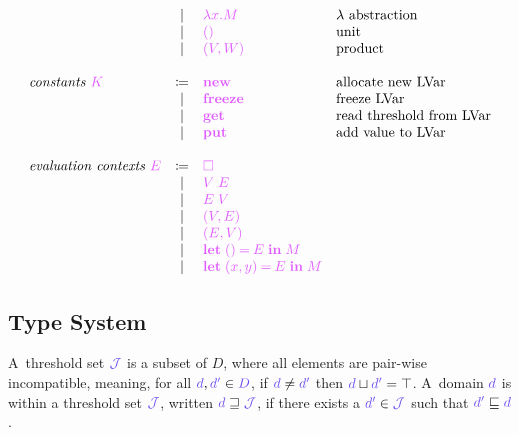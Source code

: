 \documentclass[main.tex]{subfiles}
\begin{document}
\[\begin{array}{lcll}
  & \sep      & \tm{\lambda x.M}              & \lambda \text{ abstraction} \\
  & \sep      & \tm{\unit}                    & \text{unit} \\
  & \sep      & \tm{\pair{V}{W}}              & \text{product} \\
  \\
  \textit{constants }\tm{K}
  & \coloneqq & \tm{\lvarnew}                 & \text{allocate new LVar} \\
  & \sep      & \tm{\lvarfreeze}              & \text{freeze LVar} \\
  & \sep      & \tm{\lvarget}                 & \text{read threshold from LVar} \\
  & \sep      & \tm{\lvarput}                 & \text{add value to LVar} \\
  \\
  \textit{evaluation contexts }\tm{E}
  & \coloneqq & \tm{\hole}                 \\
  & \sep      & \tm{V\; E}                 \\
  & \sep      & \tm{E\; V}                 \\
  & \sep      & \tm{(V, E)}                \\
  & \sep      & \tm{(E, V)}                \\
  & \sep      & \tm{\letunit{E}{M}}        \\
  & \sep      & \tm{\letpair{x}{y}{E}{M}}  \\
\end{array}
\]

\subsection{Type System}%
\label{sec:llam-typing}

\begin{definition}
  A~threshold set $\ty{\tyJ}$ is a subset of $D$, where all elements are pair-wise incompatible, meaning,  for all $\ty{d}, \ty{d'} \in \ty{D}$, if $\ty{d} \neq \ty{d'}$ then $\ty{d} \sqcup \ty{d'} = \top$.
  A~domain $\ty{d}$ is within a threshold set $\tyJ$, written $\ty{d}\sqsupseteq\tyJ$, if there exists a $\ty{d'}\in\tyJ$ such that $\ty{d'}\sqsubseteq\ty{d}$.
\end{definition}
\end{document}
